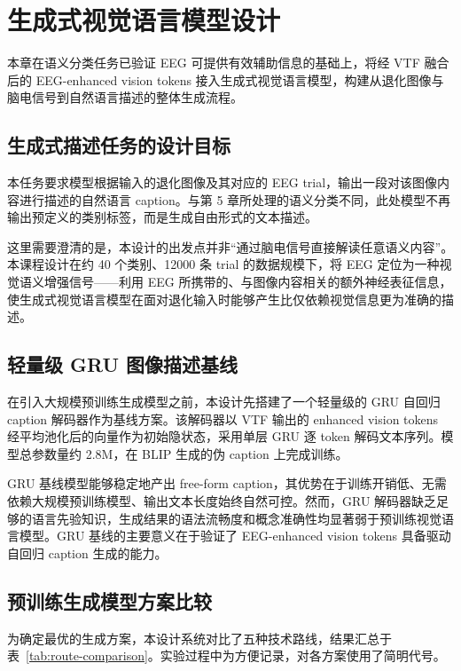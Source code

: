 \section{生成式视觉语言模型设计}

本章在语义分类任务已验证 EEG 可提供有效辅助信息的基础上，将经 VTF 融合后的 EEG-enhanced vision tokens 接入生成式视觉语言模型，构建从退化图像与脑电信号到自然语言描述的整体生成流程。

\subsection{生成式描述任务的设计目标}

本任务要求模型根据输入的退化图像及其对应的 EEG trial，输出一段对该图像内容进行描述的自然语言 caption。与第 5 章所处理的语义分类不同，此处模型不再输出预定义的类别标签，而是生成自由形式的文本描述。

这里需要澄清的是，本设计的出发点并非``通过脑电信号直接解读任意语义内容''。本课程设计在约 40 个类别、12000 条 trial 的数据规模下，将 EEG 定位为一种视觉语义增强信号——利用 EEG 所携带的、与图像内容相关的额外神经表征信息，使生成式视觉语言模型在面对退化输入时能够产生比仅依赖视觉信息更为准确的描述。

\subsection{轻量级 GRU 图像描述基线}

在引入大规模预训练生成模型之前，本设计先搭建了一个轻量级的 GRU 自回归 caption 解码器作为基线方案。该解码器以 VTF 输出的 enhanced vision tokens 经平均池化后的向量作为初始隐状态，采用单层 GRU 逐 token 解码文本序列。模型总参数量约 2.8M，在 BLIP 生成的伪 caption 上完成训练。

GRU 基线模型能够稳定地产出 free-form caption，其优势在于训练开销低、无需依赖大规模预训练模型、输出文本长度始终自然可控。然而，GRU 解码器缺乏足够的语言先验知识，生成结果的语法流畅度和概念准确性均显著弱于预训练视觉语言模型。GRU 基线的主要意义在于验证了 EEG-enhanced vision tokens 具备驱动自回归 caption 生成的能力。

\subsection{预训练生成模型方案比较}

为确定最优的生成方案，本设计系统对比了五种技术路线，结果汇总于表~\ref{tab:route-comparison}。实验过程中为方便记录，对各方案使用了简明代号。

